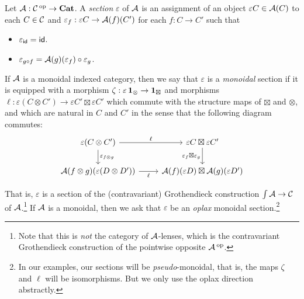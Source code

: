 \begin{defn}
Let $\operatorname{\mathcal{A}} : \operatorname{\mathcal{C}}\operatorname{^\text{op}} \to \textbf{Cat}$. A \emph{section} $\varepsilon$ of $\operatorname{\mathcal{A}}$ is an
assignment of an object $\varepsilon C \in \operatorname{\mathcal{A}}(C)$ to each $C \in \operatorname{\mathcal{C}}$ and
$\varepsilon_f : \varepsilon C \to \operatorname{\mathcal{A}}(f)(C')$ for each $f : C \to C'$ such that
\begin{itemize}
\item $\varepsilon_{\operatorname{\mathsf{id}}} = \operatorname{\mathsf{id}}$.
\item $\varepsilon_{g \circ f} = \operatorname{\mathcal{A}}(g)(\varepsilon_f) \circ \varepsilon_g$.
\end{itemize}

If $\operatorname{\mathcal{A}}$ is a monoidal indexed category, then we say that $\varepsilon$ is a
\emph{monoidal} section if it is equipped with a morphism $\zeta : \varepsilon
\operatorname{\textbf{1}}_{\otimes} \to \operatorname{\textbf{1}}_{\boxtimes}$ and morphisms $\ell : \varepsilon(C \otimes
C') \to \varepsilon C'
\boxtimes \varepsilon C'$ which commute with the
structure maps of $\boxtimes$ and $\otimes$, and which are natural in $C$ and
$C'$ in the sense that the following diagram commutes: 
\[
  \begin{tikzcd}
   \varepsilon(C \otimes C')  \arrow[r,"\ell" ] \arrow[d, "\varepsilon_{f \otimes g}"] & \varepsilon C \boxtimes \varepsilon C'  \arrow[d,"\varepsilon_f \boxtimes
    \varepsilon_g"' ]\\
    \Aa(f \otimes g)( \varepsilon(D \otimes D') ) \arrow[r, "\ell"'] & \Aa(f)( \varepsilon D ) \boxtimes \Aa(g)( \varepsilon D' )
  \end{tikzcd}
\]

That is, $\varepsilon$ is a section of the (contravariant) Grothendieck
construction $\int \operatorname{\mathcal{A}} \to \operatorname{\mathcal{C}}$ of $\operatorname{\mathcal{A}}$.\footnote{Note that this is \emph{not} the
  category of $\operatorname{\mathcal{A}}$-lenses, which is the contravariant Grothendieck construction
of the pointwise opposite $\operatorname{\mathcal{A}}\operatorname{^\text{op}}$.}
 If $\operatorname{\mathcal{A}}$ is a monoidal, then we ask that
 $\varepsilon$ be an \emph{oplax} monoidal section.\footnote{In our examples,
   our sections will be \emph{pseudo}-monoidal, that is, the maps $\zeta$ and $\ell$
 will be isomorphisms. But we only use the oplax direction abstractly.}
\end{defn}

